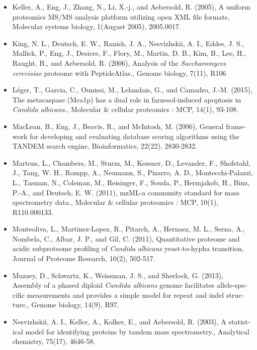 \begin{otherlanguage}{british}
\begin{itemize}[leftmargin=*]
\item[]{%
Keller, A., Eng, J., Zhang, N., Li, X.-j., and Aebersold, R. (2005), A uniform proteomics MS/MS
analysis platform utilizing open XML file formats, Molecular systems biology, 1(August
2005), 2005.0017.
}

\item[]{%
King, N. L., Deutsch, E. W., Ranish, J. A., Nesvizhskii, A. I., Eddes, J. S., Mallick, P., Eng, J.,
Desiere, F., Flory, M., Martin, D. B., Kim, B., Lee, H., Raught, B., and Aebersold, R. (2006),
Analysis of the \textit{Saccharomyces cerevisiae} proteome with PeptideAtlas., Genome biology,
7(11), R106
}

\item[]{%
L\'eger, T., Garcia, C., Ounissi, M., Lelandais, G., and Camadro, J.-M. (2015), 
The metacaspase (Mca1p) has a dual role in farnesol-induced apoptosis in \textit{Candida albicans}.,
Molecular \& cellular proteomics : MCP, 14(1), 93-108.}


\item[]{%
MacLean, B., Eng, J., Beavis, R., and McIntosh, M. (2006), General framework for developing
and evaluating database scoring algorithms using the TANDEM search engine, 
Bioinformatics, 22(22), 2830-2832.
}

\item[]{%
Martens, L., Chambers, M., Sturm, M., Kessner, D., Levander, F., Shofstahl, J., Tang, W. H.,
Rompp, A., Neumann, S., Pizarro, A. D., Montecchi-Palazzi, L., Tasman, N., Coleman, M.,
Reisinger, F., Souda, P., Hermjakob, H., Binz, P.-A., and Deutsch, E. W. (2011), mzML-a
community standard for mass spectrometry data., Molecular \& cellular proteomics : MCP,
10(1), R110.000133.
}

\item[]{%
Monteoliva, L., Martinez-Lopez, R., Pitarch, A., Hernaez, M. L., Serna, A., Nombela, C., Albar,
J. P., and Gil, C. (2011), Quantitative proteome and acidic subproteome profiling of \textit{Candida
albicans} yeast-to-hypha transition, Journal of Proteome Research, 10(2), 502-517.
}

\item[]{%
Muzzey, D., Schwartz, K., Weissman, J. S., and Sherlock, G. (2013), Assembly of a phased
diploid \textit{Candida albicans} genome facilitates allele-specific measurements and provides a
simple model for repeat and indel structure., Genome biology, 14(9), R97.
}

\item[]{%
Nesvizhskii, A. I., Keller, A., Kolker, E., and Aebersold, R. (2003), A statistical model for 
identifying proteins by tandem mass spectrometry., Analytical chemistry, 75(17), 4646-58.
}


\end{itemize}
\end{otherlanguage}
